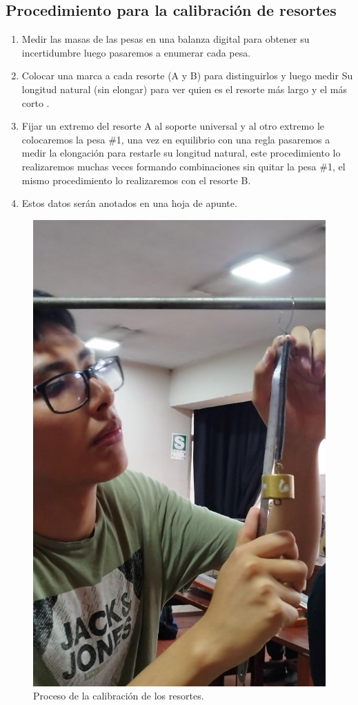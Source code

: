 \documentclass[../main.tex]{subfiles}
\begin{document}
\subsection{Procedimiento para la calibración de resortes}
\begin{enumerate}
  \item Medir las masas de las pesas en una balanza digital para
  obtener su incertidumbre luego pasaremos a enumerar cada pesa.
  \item Colocar una marca a cada resorte (A y B) para distinguirlos y 
  luego medir Su longitud natural (sin elongar) para ver quien es el resorte más 
  largo y el más corto .
  \item Fijar un extremo del resorte A al soporte universal y al otro extremo 
  le colocaremos la pesa $\#$1, una vez en equilibrio con una regla pasaremos 
  a medir la elongación para restarle su longitud natural,
  este procedimiento lo realizaremos muchas veces formando combinaciones
  sin quitar la pesa $\#$1, el mismo procedimiento lo realizaremos
  con el resorte B.
  \item Estos datos serán anotados en una hoja de apunte.
\end{enumerate}

\begin{figure}[H]
  \centering
  \includegraphics[width=0.4\linewidth]{images/proc3.jpg}
  \caption{Proceso de la calibración de los resortes.}
  \label{fig:proc3}
\end{figure}
\end{document}
